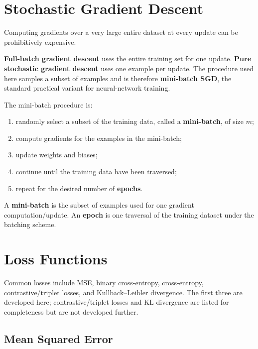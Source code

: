 \documentclass[11pt,a4paper]{report}
\begin{document}
\section{Stochastic Gradient Descent}

Computing gradients over a very large entire dataset at every update can be prohibitively expensive.

\begin{notationbox}[title={Gradient-descent terminology}]
\textbf{Full-batch gradient descent} uses the entire training set for one update. \textbf{Pure stochastic gradient descent} uses one example per update. The procedure used here samples a subset of examples and is therefore \textbf{mini-batch SGD}, the standard practical variant for neural-network training.
\end{notationbox}

The mini-batch procedure is:
\begin{enumerate}
  \item randomly select a subset of the training data, called a \textbf{mini-batch}, of size $m$;
  \item compute gradients for the examples in the mini-batch;
  \item update weights and biases;
  \item continue until the training data have been traversed;
  \item repeat for the desired number of \textbf{epochs}.
\end{enumerate}

\begin{definitionbox}[title={Epoch and mini-batch}]
A \textbf{mini-batch} is the subset of examples used for one gradient computation/update. An \textbf{epoch} is one traversal of the training dataset under the batching scheme.
\end{definitionbox}

\section{Loss Functions}

Common losses include MSE, binary cross-entropy, cross-entropy, contrastive/triplet losses, and Kullback--Leibler divergence. The first three are developed here; contrastive/triplet losses and KL divergence are listed for completeness but are not developed further.

\subsection{Mean Squared Error}
\end{document}

